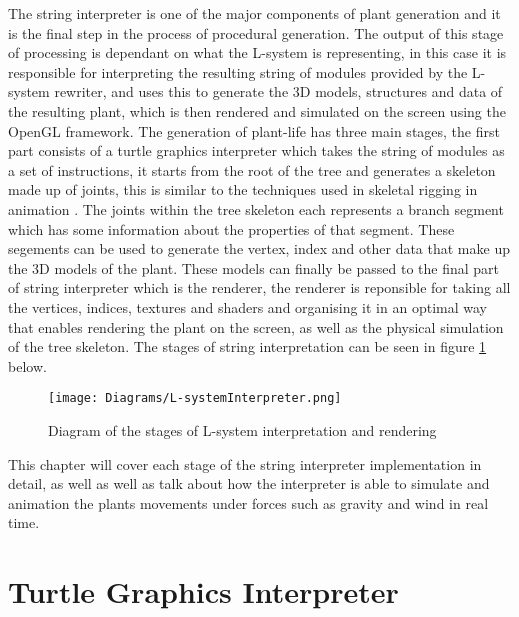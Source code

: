 
\lettrine[lines=3]{T}{}he string interpreter is one of the major components of plant generation and it is the final step in the process of procedural generation. The output of this stage of processing is dependant on what the L-system is representing, in this case it is responsible for interpreting the resulting string of modules provided by the L-system rewriter, and uses this to generate the 3D models, structures and data of the resulting plant, which is then rendered and simulated on the screen using the OpenGL framework. The generation of plant-life has three main stages, the first part consists of a turtle graphics interpreter which takes the string of modules as a set of instructions, it starts from the root of the tree and generates a skeleton made up of joints, this is similar to the techniques used in skeletal rigging in animation \cite{gregory2014game}. The joints within the tree skeleton each represents a branch segment which has some information about the properties of that segment. These segements can be used to generate the vertex, index and other data that make up the 3D models of the plant. These models can finally be passed to the final part of string interpreter which is the renderer, the renderer is reponsible for taking all the vertices, indices, textures and shaders and organising it in an optimal way that enables rendering the plant on the screen, as well as the physical simulation of the tree skeleton. The stages of string interpretation can be seen in figure \ref{l-system interpreter} below. 

\begin{figure}[htbp]
	{\centering
		\vspace{7px}
		\texttt{[image: Diagrams/L-systemInterpreter.png]}
		\caption{Diagram of the stages of L-system interpretation and rendering} \label{l-system interpreter}
	}
\end{figure}
\FloatBarrier

\noindent
This chapter will cover each stage of the string interpreter implementation in detail, as well as well as talk about how the interpreter is able to simulate and animation the plants movements under forces such as gravity and wind in real time. 

\section{Turtle Graphics Interpreter}

